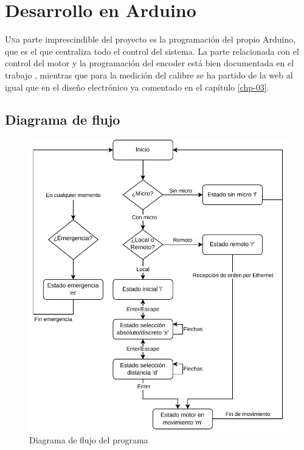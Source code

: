 \chapter{Desarrollo en Arduino}\label{chp-05}

\lettrine[lraise=-0.1, lines=2, loversize=0.2]{U}na parte imprescindible del proyecto es la programación del propio Arduino, que es el que centraliza
todo el control del sistema. La parte relacionada con el control del motor y la programación del encoder 
está bien documentada en el trabajo \cite{tapia}, mientras que para la medición del calibre se ha partido
de la web \cite{caliper} al igual que en el diseño electrónico ya comentado en el capítulo \ref{chp-03}.

\section{Diagrama de flujo}

\begin{figure}[hbtp]
    \centering
    \includegraphics[height=0.5\textheight]{05-arduino/diagramaflujo.pdf}
    \caption{Diagrama de flujo del programa}
    \label{fig:diagramaflujo}
    \end{figure}

